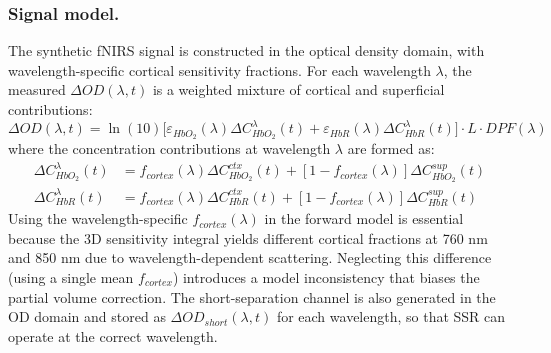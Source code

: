 \documentclass[11pt]{article}
\def\mathrm#1{#1}%
\def\,{ }%
\begin{document}
\subsubsection{Signal model.}
The synthetic fNIRS signal is constructed in the optical density domain, with wavelength-specific cortical sensitivity fractions. For each wavelength $\lambda$, the measured $\Delta\mathrm{OD}(\lambda, t)$ is a weighted mixture of cortical and superficial contributions:
\begin{equation}
\Delta\mathrm{OD}(\lambda, t) = \ln(10)\,\bigl[\varepsilon_{\mathrm{HbO_2}}(\lambda)\,\Delta C_{\mathrm{HbO_2}}^{\lambda}(t) + \varepsilon_{\mathrm{HbR}}(\lambda)\,\Delta C_{\mathrm{HbR}}^{\lambda}(t)\bigr] \cdot L \cdot \mathrm{DPF}(\lambda)
\label{eq:signal_model}
\end{equation}
where the concentration contributions at wavelength $\lambda$ are formed as:
\begin{align}
\Delta C_{\mathrm{HbO_2}}^{\lambda}(t) &= f_{\mathrm{cortex}}(\lambda)\,\Delta C_{\mathrm{HbO_2}}^{\mathrm{ctx}}(t) + [1 - f_{\mathrm{cortex}}(\lambda)]\,\Delta C_{\mathrm{HbO_2}}^{\mathrm{sup}}(t) \\
\Delta C_{\mathrm{HbR}}^{\lambda}(t) &= f_{\mathrm{cortex}}(\lambda)\,\Delta C_{\mathrm{HbR}}^{\mathrm{ctx}}(t) + [1 - f_{\mathrm{cortex}}(\lambda)]\,\Delta C_{\mathrm{HbR}}^{\mathrm{sup}}(t)
\end{align}
Using the wavelength-specific $f_{\mathrm{cortex}}(\lambda)$ in the forward model is essential because the 3D sensitivity integral yields different cortical fractions at 760\,nm and 850\,nm due to wavelength-dependent scattering. Neglecting this difference (using a single mean $f_{\mathrm{cortex}}$) introduces a model inconsistency that biases the partial volume correction. The short-separation channel is also generated in the OD domain and stored as $\Delta\mathrm{OD}_{\mathrm{short}}(\lambda, t)$ for each wavelength, so that SSR can operate at the correct wavelength.
\end{document}
